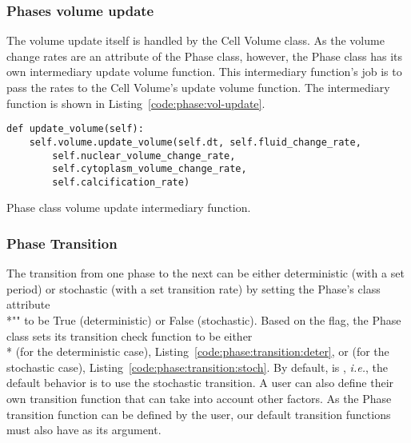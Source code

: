 \subsubsection{Phases volume update}\label{sec:meth:phase:vol-update}
The volume update itself is handled by the Cell Volume class. As the volume change rates are an attribute of the Phase class, however, the Phase class has its own intermediary update volume function. This intermediary function's job is to pass the rates to the Cell Volume's update volume function. The intermediary function is shown in Listing~\ref{code:phase:vol-update}. 

\begin{listing}[!ht]
\begin{verbatim}
def update_volume(self):
    self.volume.update_volume(self.dt, self.fluid_change_rate, 
        self.nuclear_volume_change_rate, 
        self.cytoplasm_volume_change_rate, 
        self.calcification_rate)
\end{verbatim}
\caption{Phase class volume update intermediary function.}\label{code:phase:vol-update}
\end{listing}



\subsubsection{Phase Transition}\label{app:sec:meth:phase:trans}

The transition from one phase to the next can be either deterministic (with a set period) or stochastic (with a set transition rate) by setting the Phase's class attribute \\*"" to be True (deterministic) or False (stochastic). Based on the flag, the Phase class sets its transition check function to be either \\* (for the deterministic case), Listing~\ref{code:phase:transition:deter}, or \newline{} (for the stochastic case), Listing~\ref{code:phase:transition:stoch}. By default,  is , \textit{i.e.}, the default behavior is to use the stochastic transition. A user can also define their own transition function that can take into account other factors. As the Phase transition function can be defined by the user, our default transition functions must also have  as its argument. 

